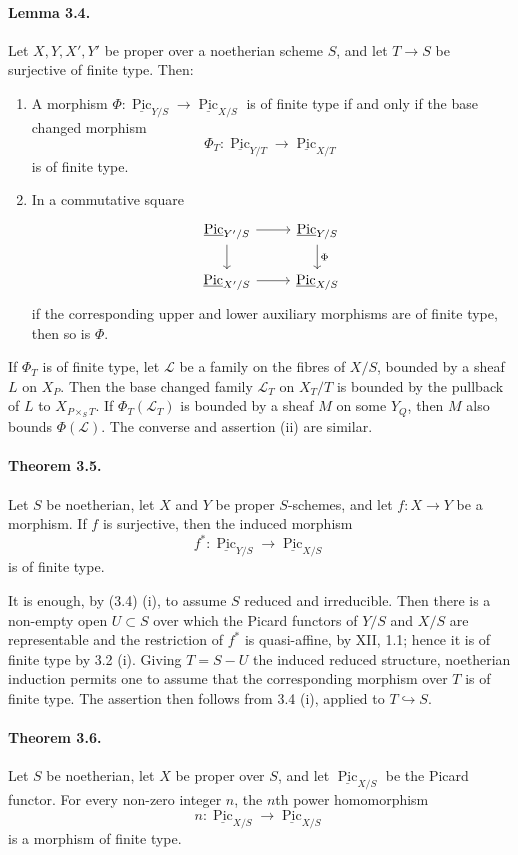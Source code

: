 \documentclass[12pt]{article}
\newcommand{\cL}{\mathcal L}
\newcommand{\Pic}{\operatorname{Pic}}
\newcommand{\longto}{\longrightarrow}
\begin{document}
\paragraph{Lemma 3.4.}
Let $X,Y,X',Y'$ be proper over a noetherian scheme $S$, and let $T\to S$ be surjective of finite type. Then:
\begin{enumerate}[label=\roman*)]
\item A morphism $\Phi:\underline{\Pic}_{Y/S}\to\underline{\Pic}_{X/S}$ is of finite type if and only if the base changed morphism
\[
\Phi_T:\underline{\Pic}_{Y/T}\to\underline{\Pic}_{X/T}
\]
is of finite type.
\item In a commutative square
\[
\begin{tikzcd}
\underline{\Pic}_{Y'/S} \arrow[r]\arrow[d] &
\underline{\Pic}_{Y/S}\arrow[d,"\Phi"]\\
\underline{\Pic}_{X'/S} \arrow[r] &
\underline{\Pic}_{X/S}
\end{tikzcd}
\]
if the corresponding upper and lower auxiliary morphisms are of finite type, then so is $\Phi$.
\end{enumerate}

If $\Phi_T$ is of finite type, let $\cL$ be a family on the fibres of $X/S$, bounded by a sheaf $L$ on $X_P$. Then the base changed family $\cL_T$ on $X_T/T$ is bounded by the pullback of $L$ to $X_{P\times_S T}$. If $\Phi_T(\cL_T)$ is bounded by a sheaf $M$ on some $Y_Q$, then $M$ also bounds $\Phi(\cL)$. The converse and assertion (ii) are similar.

\paragraph{Theorem 3.5.}
Let $S$ be noetherian, let $X$ and $Y$ be proper $S$-schemes, and let $f:X\to Y$ be a morphism. If $f$ is surjective, then the induced morphism
\[
f^*:\underline{\Pic}_{Y/S}\longto\underline{\Pic}_{X/S}
\]
is of finite type.

It is enough, by (3.4) (i), to assume $S$ reduced and irreducible. Then there is a non-empty open $U\subset S$ over which the Picard functors of $Y/S$ and $X/S$ are representable and the restriction of $f^*$ is quasi-affine, by XII, 1.1; hence it is of finite type by 3.2 (i). Giving $T=S-U$ the induced reduced structure, noetherian induction permits one to assume that the corresponding morphism over $T$ is of finite type. The assertion then follows from 3.4 (i), applied to $T\hookrightarrow S$.

\paragraph{Theorem 3.6.}
Let $S$ be noetherian, let $X$ be proper over $S$, and let $\underline{\Pic}_{X/S}$ be the Picard functor. For every non-zero integer $n$, the $n$th power homomorphism
\[
n:\underline{\Pic}_{X/S}\longto \underline{\Pic}_{X/S}
\]
is a morphism of finite type.
\end{document}
